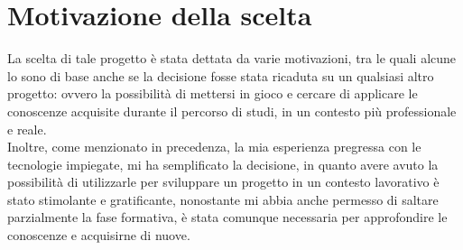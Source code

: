 \section{Motivazione della scelta}
\label{sec:motivazione-scelta}

La scelta di tale progetto è stata dettata da varie motivazioni, tra le quali alcune lo sono di base anche se la decisione fosse stata ricaduta su un qualsiasi altro progetto: ovvero la possibilità di mettersi in gioco e cercare di applicare le conoscenze acquisite durante il percorso di studi, in un contesto più professionale e reale. \\
Inoltre, come menzionato in precedenza, la mia esperienza pregressa con le tecnologie impiegate, mi ha semplificato la decisione, in quanto avere avuto la possibilità di utilizzarle per sviluppare un progetto in un contesto lavorativo è stato stimolante e gratificante, nonostante mi abbia anche permesso di saltare parzialmente la fase formativa, è stata comunque necessaria per approfondire le conoscenze e acquisirne di nuove.
